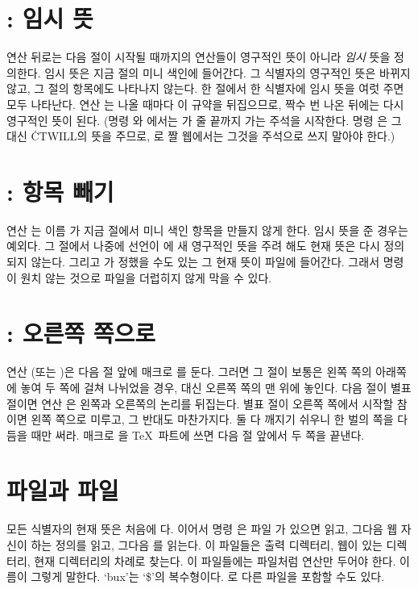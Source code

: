 \section{: 임시 뜻}
연산  뒤로는 다음 절이 시작될 때까지의  연산들이 영구적인 뜻이
아니라 {\it 임시\/} 뜻을 정의한다. 임시 뜻은 지금 절의 미니 색인에 들어간다. 그
식별자의 영구적인 뜻은 바뀌지 않고, 그 절의 항목에도 나타나지 않는다. 한 절에서
한 식별자에 임시 뜻을 여럿 주면 모두 나타난다. 연산 는 나올 때마다 이
규약을 뒤집으므로, 짝수 번 나온 뒤에는 다시 영구적인 뜻이 된다. (명령 와
에서는 가 줄 끝까지 가는 주석을 시작한다. 명령 은
그 대신 \.{CTWILL}의 뜻을 주므로, 로 짤 웹에서는 그것을 주석으로 쓰지
말아야 한다.)

\section{: 항목 빼기}
연산 는 이름 가 지금 절에서 미니 색인 항목을 만들지 않게 한다.
임시 뜻을 준 경우는 예외다. 그 절에서 나중에 선언이 에 새 영구적인 뜻을
주려 해도 현재 뜻은 다시 정의되지 않는다. 그리고 가 정했을 수도
있는 그 현재 뜻이  파일에 들어간다. 그래서 명령 이 원치 않는
것으로  파일을 더럽히지 않게 막을 수 있다.

\section{: 오른쪽 쪽으로}
연산 (또는 )은 다음 절 앞에 매크로 를 둔다.
그러면 그 절이 보통은 왼쪽 쪽의 아래쪽에 놓여 두 쪽에 걸쳐 나뉘었을 경우, 대신
오른쪽 쪽의 맨 위에 놓인다. 다음 절이 별표 절이면 연산 은 왼쪽과 오른쪽의
논리를 뒤집는다. 별표 절이 오른쪽 쪽에서 시작할 참이면 왼쪽 쪽으로 미루고, 그
반대도 마찬가지다. 둘 다 깨지기 쉬우니 한 벌의 쪽을 다듬을 때만 써라. 매크로
을 \TeX\ 파트에 쓰면 다음 절 앞에서 두 쪽을 끝낸다.

\section{ 파일과  파일}
모든 식별자의 현재 뜻은 처음에 다. 이어서 명령
은 파일 가 있으면 읽고, 그다음 웹 자신이 하는 정의를
읽고, 그다음 를 읽는다. 이  파일들은 출력 디렉터리, 웹이 있는
디렉터리, 현재 디렉터리의 차례로 찾는다. 이 파일들에는  파일처럼
 연산만 두어야 한다. 이름이 그렇게 말한다. `bux'는 `\$'의 복수형이다.
로 다른 파일을 포함할 수도 있다.

